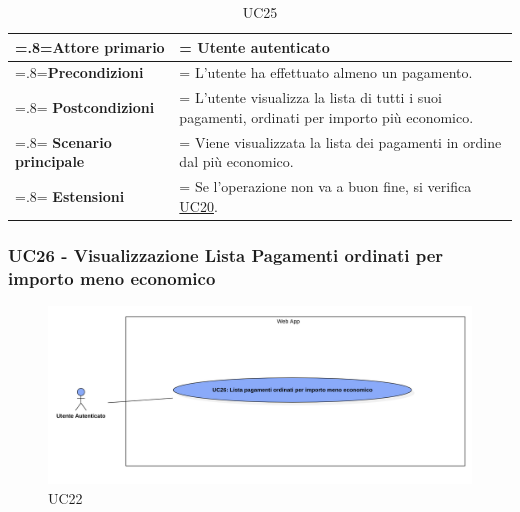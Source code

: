            \begin{table}[H]
                \centering
                \renewcommand{\arraystretch}{1.8}
                \renewcommand\tabularxcolumn[1]{m{#1}}
                \begin{tabularx}{0.9\textwidth} {
                    >{\hsize=.8\hsize\linewidth=\hsize}X
                    >{\hsize=1.2\hsize\linewidth=\hsize}X}
                    \hline
                    \textbf{Attore primario} & Utente autenticato \\
                    \hline
                    \textbf{Precondizioni} & L'utente ha effettuato almeno un pagamento. \\
                    \hline
                    \textbf{Postcondizioni} & L'utente visualizza la lista di tutti i suoi pagamenti, ordinati per importo più economico. \\
                    \hline
                    \textbf{Scenario principale} & Viene visualizzata la lista dei pagamenti in ordine dal più economico. \\
                    \hline
                    \textbf{Estensioni} & Se l'operazione non va a buon fine, si verifica \hyperref[UC20]{UC20}. \\
                    \hline
                \end{tabularx}
                \caption{UC25}
            \end{table}

        \subsubsection{UC26 - Visualizzazione Lista Pagamenti ordinati per importo meno economico}
        \label{UC26}

        \begin{figure}[H]
            \centering
            \includegraphics[scale=0.4]{src/img/UC26.png}
            \caption{UC22}
        \end{figure}

